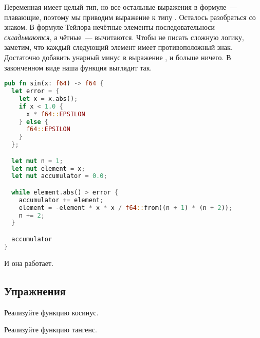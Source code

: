 Переменная  имеет целый тип, но все остальные выражения в формуле~--- плавающие, поэтому мы приводим выражение  к типу .
Осталось разобраться со знаком.
В формуле Тейлора нечётные элементы последовательноси {\em складываются}, а чётные~--- вычитаются.
Чтобы не писать сложную логику, заметим, что каждый следующий элемент имеет противоположный знак.
Достаточно добавить унарный минус в выражение , и больше ничего.
В законченном виде наша функция выглядит так.

\begin{lstlisting}[language=Rust]
pub fn sin(x: f64) -> f64 {
  let error = {
    let x = x.abs();
    if x < 1.0 {
      x * f64::EPSILON
    } else {
      f64::EPSILON
    }
  };

  let mut n = 1;
  let mut element = x;
  let mut accumulator = 0.0;

  while element.abs() > error {
    accumulator += element;
    element = -element * x * x / f64::from((n + 1) * (n + 2));
    n += 2;
  }

  accumulator
}
\end{lstlisting}

И она работает.

\subsection{Упражнения}

\begin{Exercise}
  \Question
  Реализуйте функцию косинус.
\end{Exercise}

\begin{Exercise}
  \Question
  Реализуйте функцию тангенс.
\end{Exercise}
